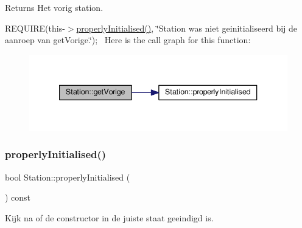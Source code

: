 \begin{DoxyReturn}{Returns}
Het vorig station.
\end{DoxyReturn}
R\+E\+Q\+U\+I\+RE(this-\/$>$\hyperlink{class_station_a9ce626dd0599e3ea8107404a59c21e16}{properly\+Initialised()}, \char`\"{}\+Station was niet geinitialiseerd bij de aanroep van get\+Vorige.\char`\"{});~\newline
Here is the call graph for this function\+:\nopagebreak
\begin{figure}[H]
\begin{center}
\leavevmode
\includegraphics[width=340pt]{class_station_a69c0539e899ff540c38eb434a69bfa9e_cgraph}
\end{center}
\end{figure}
\mbox{\label{class_station_a9ce626dd0599e3ea8107404a59c21e16}} 
\subsubsection{\texorpdfstring{properly\+Initialised()}{properlyInitialised()}}
{\footnotesize\ttfamily bool Station\+::properly\+Initialised (\begin{DoxyParamCaption}{ }\end{DoxyParamCaption}) const}



Kijk na of de constructor in de juiste staat geeindigd is. 

